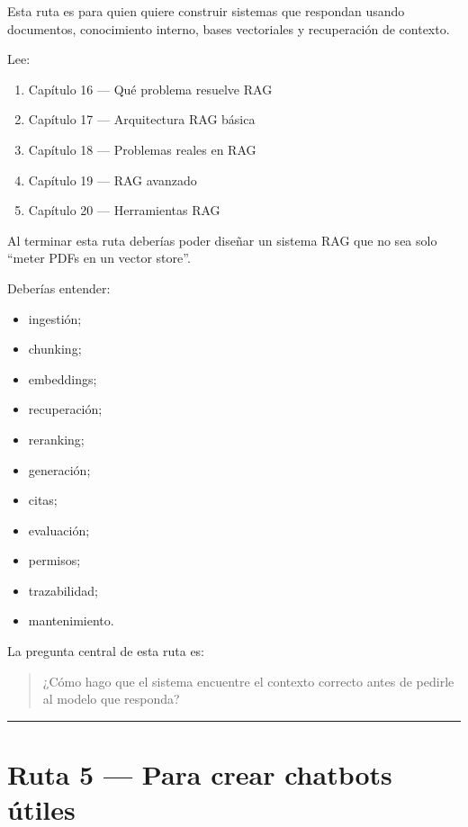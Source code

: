 Esta ruta es para quien quiere construir sistemas que respondan usando
documentos, conocimiento interno, bases vectoriales y recuperación de
contexto.

Lee:

\begin{enumerate}
\def\labelenumi{\arabic{enumi}.}
\tightlist
\item
  Capítulo 16 --- Qué problema resuelve RAG
\item
  Capítulo 17 --- Arquitectura RAG básica
\item
  Capítulo 18 --- Problemas reales en RAG
\item
  Capítulo 19 --- RAG avanzado
\item
  Capítulo 20 --- Herramientas RAG
\end{enumerate}

Al terminar esta ruta deberías poder diseñar un sistema RAG que no sea
solo ``meter PDFs en un vector store''.

Deberías entender:

\begin{itemize}
\tightlist
\item
  ingestión;
\item
  chunking;
\item
  embeddings;
\item
  recuperación;
\item
  reranking;
\item
  generación;
\item
  citas;
\item
  evaluación;
\item
  permisos;
\item
  trazabilidad;
\item
  mantenimiento.
\end{itemize}

La pregunta central de esta ruta es:

\begin{quote}
¿Cómo hago que el sistema encuentre el contexto correcto antes de
pedirle al modelo que responda?
\end{quote}

\begin{center}\rule{0.5\linewidth}{0.5pt}\end{center}

\section{Ruta 5 --- Para crear chatbots
útiles}\label{ruta-5-para-crear-chatbots-uxfatiles}

